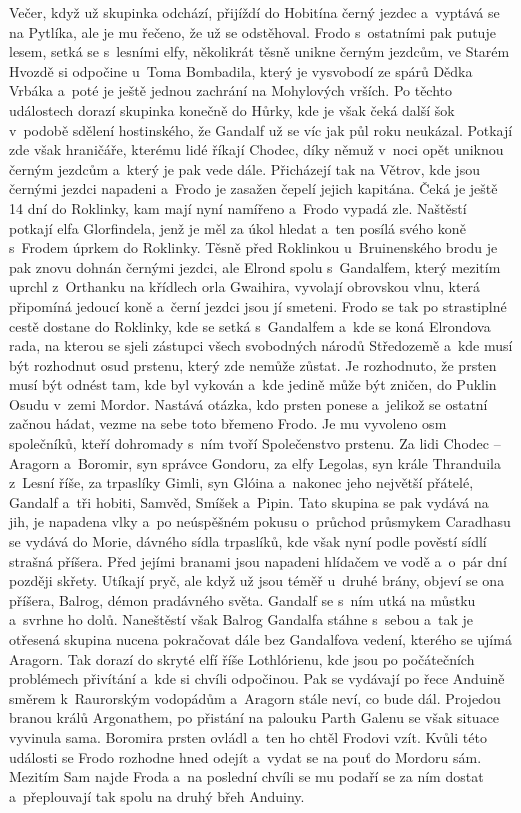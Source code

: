 {	Večer, když už skupinka odchází, přijíždí do Hobitína černý jezdec
	a~vyptává se na Pytlíka, ale je mu řečeno, že už se odstěhoval. Frodo
	s ostatními pak putuje lesem, setká se s lesními elfy, několikrát těsně
	unikne černým jezdcům, ve Starém Hvozdě si odpočine u~Toma Bombadila, který
	je vysvobodí ze spárů Dědka Vrbáka a~poté je ještě jednou zachrání na
	Mohylových vrších. Po těchto událostech dorazí skupinka konečně do Hůrky,
	kde je však čeká další šok v podobě sdělení hostinského, že Gandalf už se
	víc jak půl roku neukázal. Potkají zde však hraničáře, kterému lidé říkají
	Chodec, díky němuž v noci opět uniknou černým jezdcům a~který je pak vede
	dále. Přicházejí tak na Větrov, kde jsou černými jezdci napadeni a~Frodo je
	zasažen čepelí jejich kapitána. Čeká je ještě 14 dní do Roklinky, kam mají
	nyní namířeno a~Frodo vypadá zle. Naštěstí potkají elfa Glorfindela, jenž
	je měl za úkol hledat a~ten posílá svého koně s Frodem úprkem do Roklinky.
	Těsně před Roklinkou u~Bruinenského brodu je pak znovu dohnán černými
	jezdci, ale Elrond spolu s Gandalfem, který mezitím uprchl z Orthanku na
	křídlech orla Gwaihira, vyvolají obrovskou vlnu, která připomíná jedoucí
	koně a~černí jezdci jsou jí smeteni. Frodo se tak po strastiplné cestě
	dostane do Roklinky, kde se setká s Gandalfem a~kde se koná Elrondova rada,
	na kterou se sjeli zástupci všech svobodných národů Středozemě a~kde musí
	být rozhodnut osud prstenu, který zde nemůže zůstat. Je rozhodnuto, že
	prsten musí být odnést tam, kde byl vykován a~kde jedině může být zničen,
	do Puklin Osudu v zemi Mordor. Nastává otázka, kdo prsten ponese a~jelikož
	se ostatní začnou hádat, vezme na sebe toto břemeno Frodo. Je mu vyvoleno
	osm společníků, kteří dohromady s ním tvoří Společenstvo prstenu. Za lidi
	Chodec -- Aragorn a~Boromir, syn správce Gondoru, za elfy Legolas, syn
	krále Thranduila z Lesní říše, za trpaslíky Gimli, syn Glóina a~nakonec
	jeho největší přátelé, Gandalf a~tři hobiti, Samvěd, Smíšek a~Pipin. Tato
	skupina se pak vydává na jih, je napadena vlky a~po neúspěšném pokusu
	o~průchod průsmykem Caradhasu se vydává do Morie, dávného sídla trpaslíků,
	kde však nyní podle pověstí sídlí strašná příšera. Před jejími branami jsou
	napadeni hlídačem ve vodě a~o~pár dní později skřety. Utíkají pryč, ale
	když už jsou téměř u~druhé brány, objeví se ona příšera, Balrog, démon
	pradávného světa. Gandalf se s ním utká na můstku a~svrhne ho dolů.
	Naneštěstí však Balrog Gandalfa stáhne s sebou a~tak je otřesená skupina
	nucena pokračovat dále bez Gandalfova vedení, kterého se ujímá Aragorn. Tak
	dorazí do skryté elfí říše Lothlórienu, kde jsou po počátečních problémech
	přivítání a~kde si chvíli odpočinou. Pak se vydávají po řece Anduině směrem
	k Raurorským vodopádům a~Aragorn stále neví, co bude dál. Projedou branou
	králů Argonathem, po přistání na palouku Parth Galenu se však situace
	vyvinula sama. Boromira prsten ovládl a~ten ho chtěl Frodovi vzít. Kvůli
	této události se Frodo rozhodne hned odejít a~vydat se na pouť do Mordoru
	sám. Mezitím Sam najde Froda a~na poslední chvíli se mu podaří se za ním
	dostat a~přeplouvají tak spolu na druhý břeh Anduiny.
}


